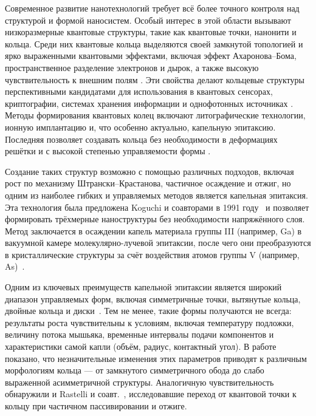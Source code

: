 \documentclass[14pt,oneside]{extarticle}
\begin{document}


\tableofcontents
\pagebreak


Современное развитие нанотехнологий требует всё более точного контроля над структурой и формой наносистем. Особый интерес в этой области вызывают низкоразмерные квантовые структуры, такие как квантовые точки, нанонити и кольца. Среди них квантовые кольца выделяются своей замкнутой топологией и ярко выраженными квантовыми эффектами, включая эффект Ахаронова–Бома, пространственное разделение электронов и дырок, а также высокую чувствительность к внешним полям \cite{Li2009, Beo2020}. Эти свойства делают кольцевые структуры перспективными кандидатами для использования в квантовых сенсорах, криптографии, системах хранения информации и однофотонных источниках \cite{Gurioli2001, SinglePhotonReview2019}. Методы формирования квантовых колец включают литографические технологии, ионную имплантацию и, что особенно актуально, капельную эпитаксию. Последняя позволяет создавать кольца без необходимости в деформациях решётки и с высокой степенью управляемости формы \cite{Korytov2012, Nemcsics2011}.

Создание таких структур возможно с помощью различных подходов, включая рост по механизму Штрански–Крастанова, частичное осаждение и отжиг, но одним из наиболее гибких и управляемых методов является капельная эпитаксия. Эта технология была предложена Koguchi и соавторами в 1991 году~\cite{koguchi1991} и позволяет формировать трёхмерные наноструктуры без необходимости напряжённого слоя. Метод заключается в осаждении капель материала группы III (например, Ga) в вакуумной камере молекулярно-лучевой эпитаксии, после чего они преобразуются в кристаллические структуры за счёт воздействия атомов группы V (например, As)~\cite{Korytov2012, Nemcsics2011}.

Одним из ключевых преимуществ капельной эпитаксии является широкий диапазон управляемых форм, включая симметричные точки, вытянутые кольца, двойные кольца и диски~\cite{Somaschini2011, Koguchi1991}. Тем не менее, такие формы получаются не всегда: результаты роста чувствительны к условиям, включая температуру подложки, величину потока мышьяка, временные интервалы подачи компонентов и характеристики самой капли (объём, радиус, контактный угол). В работе~\cite{zhou2013} показано, что незначительные изменения этих параметров приводят к различным морфологиям кольца — от замкнутого симметричного обода до слабо выраженной асимметричной структуры. Аналогичную чувствительность обнаружили и Rastelli и соавт.~\cite{rastelli2004}, исследовавшие переход от квантовой точки к кольцу при частичном пассивировании и отжиге.
\end{document}
